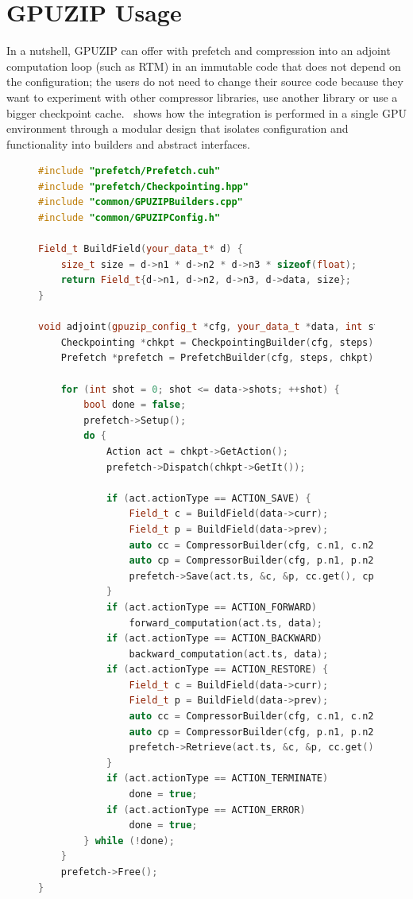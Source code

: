 \documentclass[Ingles]{ic-tese-v3}
\begin{document}
\section{GPUZIP Usage}
\label{sec:ossexample}
In a nutshell, GPUZIP can offer \checkpointing with prefetch and compression into an adjoint computation loop (such as RTM) in an immutable code that does not depend on the configuration; the users do not need to change their source code because they want to experiment with other compressor libraries, use another \checkpointing library or use a bigger checkpoint cache.~ shows how the integration is performed in a single GPU environment through a modular design that isolates configuration and functionality into builders and abstract interfaces.


\begin{figure}[h!]
\centering
\begin{lstlisting}[language=C++, caption={Example of an adjoint computation (such as RTM) integration with GPUZIP}, label={lst:cudaexample}]
#include "prefetch/Prefetch.cuh"
#include "prefetch/Checkpointing.hpp"
#include "common/GPUZIPBuilders.cpp"
#include "common/GPUZIPConfig.h"

Field_t BuildField(your_data_t* d) {
    size_t size = d->n1 * d->n2 * d->n3 * sizeof(float);
    return Field_t{d->n1, d->n2, d->n3, d->data, size};
}

void adjoint(gpuzip_config_t *cfg, your_data_t *data, int steps) {
    Checkpointing *chkpt = CheckpointingBuilder(cfg, steps);
    Prefetch *prefetch = PrefetchBuilder(cfg, steps, chkpt);

    for (int shot = 0; shot <= data->shots; ++shot) {
        bool done = false;
        prefetch->Setup();
        do {
            Action act = chkpt->GetAction();
            prefetch->Dispatch(chkpt->GetIt());

            if (act.actionType == ACTION_SAVE) {
                Field_t c = BuildField(data->curr);
                Field_t p = BuildField(data->prev);
                auto cc = CompressorBuilder(cfg, c.n1, c.n2, c.n3);
                auto cp = CompressorBuilder(cfg, p.n1, p.n2, p.n3);
                prefetch->Save(act.ts, &c, &p, cc.get(), cp.get());
            }
            if (act.actionType == ACTION_FORWARD)
                forward_computation(act.ts, data);
            if (act.actionType == ACTION_BACKWARD)
                backward_computation(act.ts, data);
            if (act.actionType == ACTION_RESTORE) {
                Field_t c = BuildField(data->curr);
                Field_t p = BuildField(data->prev);
                auto cc = CompressorBuilder(cfg, c.n1, c.n2, c.n3);
                auto cp = CompressorBuilder(cfg, p.n1, p.n2, p.n3);
                prefetch->Retrieve(act.ts, &c, &p, cc.get(), cp.get());
            }
            if (act.actionType == ACTION_TERMINATE)
                done = true;
            if (act.actionType == ACTION_ERROR)
                done = true;
        } while (!done);
    }
    prefetch->Free();
}
\end{lstlisting}
\end{figure}
\end{document}
